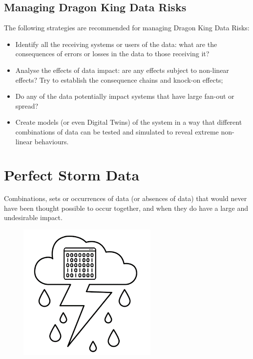 \subsection{Managing Dragon King Data Risks}
The following strategies are recommended for managing Dragon King Data Risks:
\begin{itemize}
\item Identify all the receiving systems or users of the data:
what are the consequences of errors or losses in the data to those receiving it?
\item Analyse the effects of data impact: are any effects subject to non-linear effects?
Try to establish the consequence chains and knock-on effects;
\item Do any of the data potentially impact systems that have large fan-out or spread?
\item Create models (or even Digital Twins) of the system in a way that different combinations
of data can be tested and simulated to reveal extreme non-linear behaviours.
\end{itemize}

\section{Perfect Storm Data}
 Combinations, sets or occurrences of data (or absences of data) that would never have been thought possible to occur together, and when they do have a large and undesirable impact.

\begin{figure}
  \includegraphics{images/cygStorm}
\end{figure}

